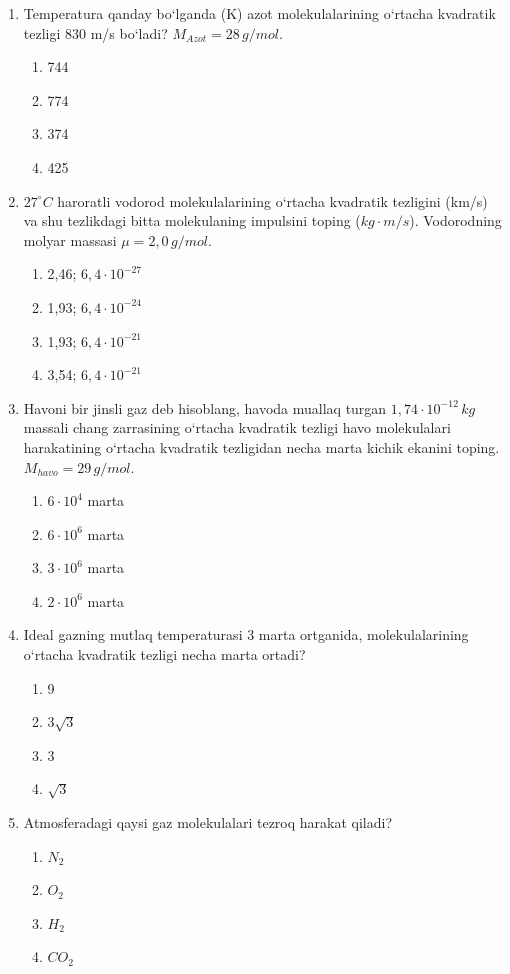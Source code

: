 \begin{enumerate}
\item Temperatura qanday bo‘lganda (K) azot molekulalarining o‘rtacha kvadratik tezligi 830 m/s bo‘ladi? $M_{Azot} = 28 \, g/mol$.
\begin{enumerate}[label=\Alph*)]
\item 744
\item 774
\item 374
\item 425
\end{enumerate}

\item $27^\circ C$ haroratli vodorod molekulalarining o‘rtacha kvadratik tezligini (km/s) va shu tezlikdagi bitta molekulaning impulsini toping ($kg \cdot m/s$). Vodorodning molyar massasi $\mu = 2,0 \, g/mol$.
\begin{enumerate}[label=\Alph*)]
\item 2,46; $6,4 \cdot 10^{-27}$
\item 1,93; $6,4 \cdot 10^{-24}$
\item 1,93; $6,4 \cdot 10^{-21}$
\item 3,54; $6,4 \cdot 10^{-21}$
\end{enumerate}

\item Havoni bir jinsli gaz deb hisoblang, havoda muallaq turgan $1,74 \cdot 10^{-12} \, kg$ massali chang zarrasining o‘rtacha kvadratik tezligi havo molekulalari harakatining o‘rtacha kvadratik tezligidan necha marta kichik ekanini toping. $M_{havo} = 29 \, g/mol$.
\begin{enumerate}[label=\Alph*)]
\item $6 \cdot 10^4$ marta
\item $6 \cdot 10^6$ marta
\item $3 \cdot 10^6$ marta
\item $2 \cdot 10^6$ marta
\end{enumerate}

\item Ideal gazning mutlaq temperaturasi 3 marta ortganida, molekulalarining o‘rtacha kvadratik tezligi necha marta ortadi?
\begin{enumerate}[label=\Alph*)]
\item 9
\item $3\sqrt{3}$
\item 3
\item $\sqrt{3}$
\end{enumerate}

\item Atmosferadagi qaysi gaz molekulalari tezroq harakat qiladi?
\begin{enumerate}[label=\Alph*)]
\item $N_2$
\item $O_2$
\item $H_2$
\item $CO_2$
\end{enumerate}


\end{enumerate}
